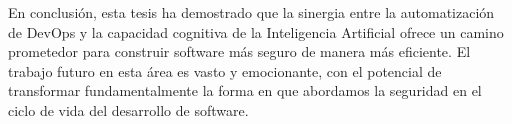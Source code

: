 En conclusión, esta tesis ha demostrado que la sinergia entre la automatización de DevOps y la capacidad cognitiva de la Inteligencia Artificial ofrece un camino prometedor para construir software más seguro de manera más eficiente. El trabajo futuro en esta área es vasto y emocionante, con el potencial de transformar fundamentalmente la forma en que abordamos la seguridad en el ciclo de vida del desarrollo de software.